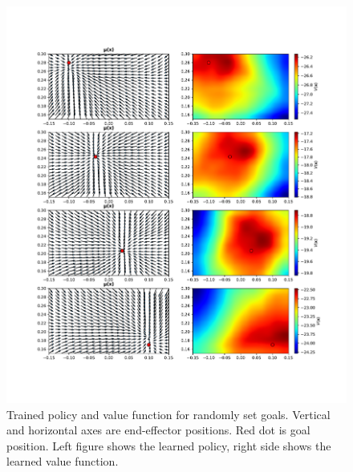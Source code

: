 \begin{figure}[h]
    \centering
    \includegraphics[width=\textwidth]{res/moving_goal_summary.pdf}

    \caption{Trained policy and value function for randomly set goals.
    Vertical and horizontal axes are end-effector positions. Red dot is goal
    position. Left figure shows the learned policy, right side shows the
    learned value function.}
    
\end{figure}
